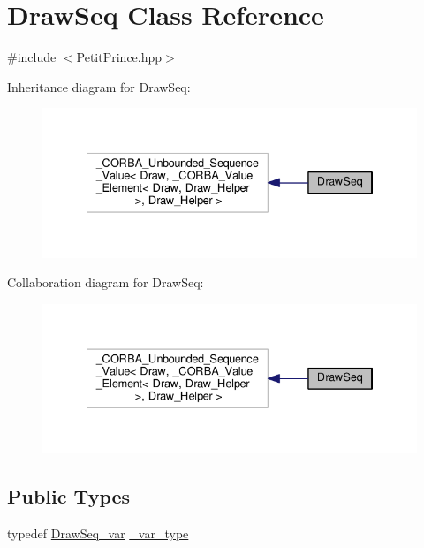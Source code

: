 \hypertarget{class_draw_seq}{}\section{Draw\+Seq Class Reference}
\label{class_draw_seq}


{\ttfamily \#include $<$Petit\+Prince.\+hpp$>$}



Inheritance diagram for Draw\+Seq\+:
\nopagebreak
\begin{figure}[H]
\begin{center}
\leavevmode
\includegraphics[width=334pt]{class_draw_seq__inherit__graph}
\end{center}
\end{figure}


Collaboration diagram for Draw\+Seq\+:
\nopagebreak
\begin{figure}[H]
\begin{center}
\leavevmode
\includegraphics[width=334pt]{class_draw_seq__coll__graph}
\end{center}
\end{figure}
\subsection*{Public Types}
\begin{DoxyCompactItemize}
\item 
typedef \hyperlink{class_draw_seq__var}{Draw\+Seq\+\_\+var} \hyperlink{class_draw_seq_a588817eec2a28116ab4b5c32cbcdbd53}{\+\_\+var\+\_\+type}
\end{DoxyCompactItemize}
